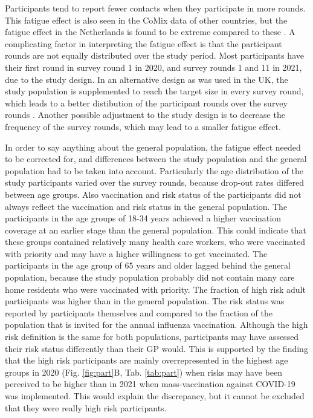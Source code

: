 \documentclass[fleqn,10pt]{wlscirep}
\begin{document}
Participants tend to report fewer contacts when they participate in more rounds. This fatigue effect is also seen in the CoMix data of other countries, but the fatigue effect in the Netherlands is found to be extreme compared to these \cite{Wong_2022b}. A complicating factor in interpreting the fatigue effect is that the participant rounds are not equally distributed over the study period. Most participants have their first round in survey round 1 in 2020, and survey rounds 1 and 11 in 2021, due to the study design. In an alternative design as was used in the UK, the study population is supplemented to reach the target size in every survey round, which leads to a better distibution of the participant rounds over the survey rounds \cite{Gimma_2022}. Another possible adjustment to the study design is to decrease the frequency of the survey rounds, which may lead to a smaller fatigue effect.

In order to say anything about the general population, the fatigue effect needed to be corrected for, and differences between the study population and the general population had to be taken into account. Particularly the age distribution of the study participants varied over the survey rounds, because drop-out rates differed between age groups. Also vaccination and risk status of the participants did not always reflect the vaccination and risk status in the general population. The participants in the age groups of 18-34 years achieved a higher vaccination coverage at an earlier stage than the general population. This could indicate that these groups contained relatively many health care workers, who were vaccinated with priority and may have a higher willingness to get vaccinated. The participants in the age group of 65 years and older lagged behind the general population, because the study population probably did not contain many care home residents who were vaccinated with priority. The fraction of high risk adult participants was higher than in the general population. The risk status was reported by participants themselves and compared to the fraction of the population that is invited for the annual influenza vaccination. Although the high risk definition is the same for both populations, participants may have assessed their risk status differently than their GP would. This is supported by the finding that the high risk participants are mainly overrepresented in the highest age groups in 2020 (Fig. \ref{fig:part}B, Tab. \ref{tab:part}) when risks may have been perceived to be higher than in 2021 when mass-vaccination against COVID-19 was implemented. This would explain the discrepancy, but it cannot be excluded that they were really high risk participants. 
\end{document}
